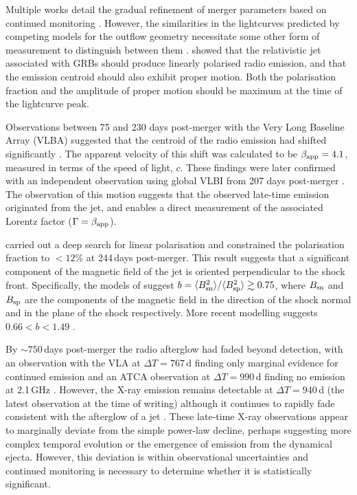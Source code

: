 Multiple works detail the gradual refinement of merger parameters based on continued monitoring \citep{2018ApJ...863L..18A,2018ApJ...868L..11M,2019MNRAS.483.1912P}. However, the similarities in the lightcurves predicted by competing models for the outflow geometry necessitate some other form of measurement to distinguish between them \citep{2018MNRAS.478..407N}. \citet{1999ApJ...524L..43S} showed that the relativistic jet associated with GRBs should produce linearly polarised radio emission, and that the emission centroid should also exhibit proper motion. Both the polarisation fraction and the amplitude of proper motion should be maximum at the time of the lightcurve peak. 

Observations between 75 and 230 days post-merger with the Very Long Baseline Array (VLBA) suggested that the centroid of the radio emission had shifted significantly \citep{2018Natur.561..355M}. The apparent velocity of this shift was calculated to be $\beta_{\rm app} = 4.1$, measured in terms of the speed of light, $c$. These findings were later confirmed with an independent observation using global VLBI from 207 days post-merger \citep{2019Sci...363..968G}. The observation of this motion suggests that the observed late-time emission originated from the jet, and enables a direct measurement of the associated Lorentz factor ($\Gamma=\beta_{\rm app}$).

\citet{2018ApJ...861L..10C} carried out a deep search for linear polarisation and constrained the polarisation fraction to $<12$\% at 244\,days post-merger. This result suggests that a significant component of the magnetic field of the jet is oriented perpendicular to the shock front. Specifically, the models of \citet{2018MNRAS.478.4128G} suggest $b=\langle B^2_{\rm sn}\rangle/\langle B^2_{\rm sp}\rangle \gtrsim 0.75$, where $B_{\rm sn}$ and $B_{\rm sp}$ are the components of the magnetic field in the direction of the shock normal and in the plane of the shock respectively. More recent modelling suggests $0.66 < b < 1.49$ \citep{2020MNRAS.491.5815G}.

By $\sim 750$\,days post-merger the radio afterglow had faded beyond detection, with an observation with the VLA at $\Delta T=767\,$d finding only marginal evidence for continued emission \citep{2020arXiv200602382M} and an ATCA observation at $\Delta T=990\,$d finding no emission at 2.1\,GHz \citep{2020arXiv200601150T}. However, the X-ray emission remains detectable at $\Delta T=940\,$d (the latest observation at the time of writing) although it continues to rapidly fade consistent with the afterglow of a jet \citep{2020arXiv200601150T,2020RNAAS...4...68H}. These late-time X-ray observations appear to marginally deviate from the simple power-law decline, perhaps suggesting more complex temporal evolution or the emergence of emission from the dynamical ejecta. However, this deviation is within observational uncertainties and continued monitoring is necessary to determine whether it is statistically significant.

